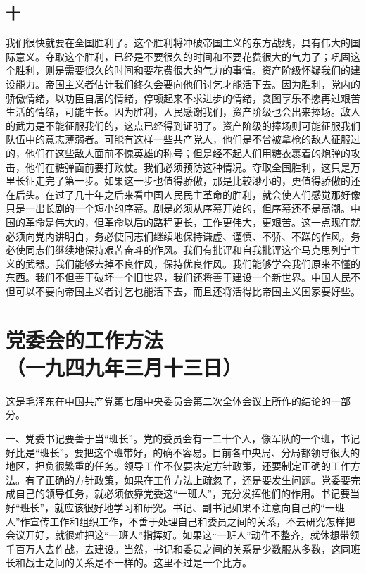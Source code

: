 \documentclass[cn,11pt,chinese]{elegantbook}
\def\myformat#1{\hfil\hfil #1}
\begin{document}
\subsection*{\myformat{十 }}
我们很快就要在全国胜利了。这个胜利将冲破帝国主义的东方战线，具有伟大的国际意义。夺取这个胜利，已经是不要很久的时间和不要花费很大的气力了；巩固这个胜利，则是需要很久的时间和要花费很大的气力的事情。资产阶级怀疑我们的建设能力。帝国主义者估计我们终久会要向他们讨乞才能活下去。因为胜利，党内的骄傲情绪，以功臣自居的情绪，停顿起来不求进步的情绪，贪图享乐不愿再过艰苦生活的情绪，可能生长。因为胜利，人民感谢我们，资产阶级也会出来捧场。敌人的武力是不能征服我们的，这点已经得到证明了。资产阶级的捧场则可能征服我们队伍中的意志薄弱者。可能有这样一些共产党人，他们是不曾被拿枪的敌人征服过的，他们在这些敌人面前不愧英雄的称号；但是经不起人们用糖衣裹着的炮弹的攻击，他们在糖弹面前要打败仗。我们必须预防这种情况。夺取全国胜利，这只是万里长征走完了第一步。如果这一步也值得骄傲，那是比较渺小的，更值得骄傲的还在后头。在过了几十年之后来看中国人民民主革命的胜利，就会使人们感觉那好像只是一出长剧的一个短小的序幕。剧是必须从序幕开始的，但序幕还不是高潮。中国的革命是伟大的，但革命以后的路程更长，工作更伟大，更艰苦。这一点现在就必须向党内讲明白，务必使同志们继续地保持谦虚、谨慎、不骄、不躁的作风，务必使同志们继续地保持艰苦奋斗的作风。我们有批评和自我批评这个马克思列宁主义的武器。我们能够去掉不良作风，保持优良作风。我们能够学会我们原来不懂的东西。我们不但善于破坏一个旧世界，我们还将善于建设一个新世界。中国人民不但可以不要向帝国主义者讨乞也能活下去，而且还将活得比帝国主义国家要好些。\\
\newpage\section*{\myformat{党委会的工作方法}\\\myformat{（一九四九年三月十三日）}}
\begin{introduction}
\item  这是毛泽东在中国共产党第七届中央委员会第二次全体会议上所作的结论的一部分。
\end{introduction}
一、党委书记要善于当“班长”。党的委员会有一二十个人，像军队的一个班，书记好比是“班长”。要把这个班带好，的确不容易。目前各中央局、分局都领导很大的地区，担负很繁重的任务。领导工作不仅要决定方针政策，还要制定正确的工作方法。有了正确的方针政策，如果在工作方法上疏忽了，还是要发生问题。党委要完成自己的领导任务，就必须依靠党委这“一班人”，充分发挥他们的作用。书记要当好“班长”，就应该很好地学习和研究。书记、副书记如果不注意向自己的“一班人”作宣传工作和组织工作，不善于处理自己和委员之间的关系，不去研究怎样把会议开好，就很难把这“一班人”指挥好。如果这“一班人”动作不整齐，就休想带领千百万人去作战，去建设。当然，书记和委员之间的关系是少数服从多数，这同班长和战士之间的关系是不一样的。这里不过是一个比方。\\
\end{document}
